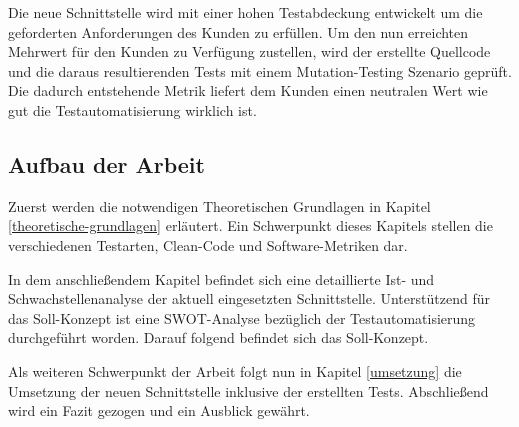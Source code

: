 Die neue Schnittstelle wird mit einer hohen Testabdeckung entwickelt um die geforderten Anforderungen des Kunden zu erfüllen. Um den nun erreichten Mehrwert für den Kunden zu Verfügung zustellen, wird der erstellte Quellcode und die daraus resultierenden Tests mit einem Mutation-Testing Szenario geprüft. Die dadurch entstehende Metrik liefert dem Kunden einen neutralen Wert wie gut die Testautomatisierung wirklich ist. 

\subsection{Aufbau der Arbeit}
Zuerst werden die notwendigen Theoretischen Grundlagen in Kapitel \ref{theoretische-grundlagen} erläutert. Ein Schwerpunkt dieses Kapitels stellen die verschiedenen Testarten, Clean-Code und Software-Metriken dar.

In dem anschließendem Kapitel befindet sich eine detaillierte Ist- und Schwachstellenanalyse der aktuell eingesetzten Schnittstelle. Unterstützend für das Soll-Konzept ist eine SWOT-Analyse bezüglich der Testautomatisierung durchgeführt worden. Darauf folgend befindet sich das Soll-Konzept.

Als weiteren Schwerpunkt der Arbeit folgt nun in Kapitel \ref{umsetzung} die Umsetzung der neuen Schnittstelle inklusive der erstellten Tests. Abschließend wird ein Fazit gezogen und ein Ausblick gewährt.



